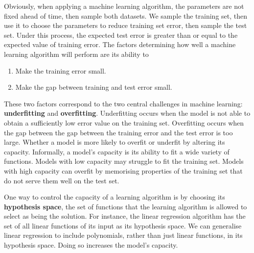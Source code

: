 Obviously, when applying a machine learning algorithm, the parameters are not
fixed ahead of time, then sample both datasets. We sample the training set,
then use it to choose the parameters to reduce training set error, then sample
the test set. Under this process, the expected test error is greater than or
equal to the expected value of training error. The factors determining how well
a machine learning algorithm will perform are its ability to
\begin{enumerate}
    \item Make the training error small.
    \item Make the gap between training and test error small.
\end{enumerate}


These two factors correspond to the two central challenges in machine learning:
\textbf{underfitting} and \textbf{overfitting}. Underfitting occurs when the
model is not able to obtain a sufficiently low error value on the training set.
Overfitting occurs when the gap between the gap between the training error and
the test error is too large. Whether a model is more likely to overfit or
underfit by altering its capacity. Informally, a model's capacity is its
ability to fit a wide variety of functions. Models with low capacity may
struggle to fit the training set. Models with high capacity can overfit by
memorising properties of the training set that do not serve them well on the
test set.


One way to control the capacity of a learning algorithm is by choosing its
\textbf{hypothesis space}, the set of functions that the learning algorithm is
allowed to select as being the solution. For instance, the linear regression
algorithm has the set of all linear functions of its input as its hypothesis
space. We can generalise linear regression to include polynomials, rather than
just linear functions, in its hypothesis space. Doing so increases the model's
capacity.

